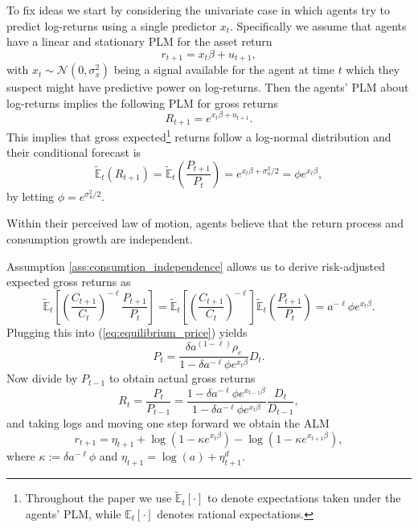 \documentclass[11pt]{article}
\begin{document}
To fix ideas we start by considering the univariate case in which agents try to predict log-returns using a single predictor $x_t$.
Specifically we assume that agents have a linear and stationary PLM for the asset return
\begin{equation}\label{eq:plm_univariate}
    r_{t+1} =  x_{t} \beta + u_{t+1},
\end{equation}
with $x_t \sim \mathcal{N}(0, \sigma^2_x)$ being a signal available for the agent at time $t$ which they suspect might have predictive power on log-returns.
Then the agents' PLM about log-returns implies the following PLM for gross returns
\begin{equation}
    R_{t+1} = e ^ {x_{t} \beta + u_{t+1}}.
\end{equation}
This implies that gross expected\footnote{
Throughout the paper we use $\tilde{\mathbb{E}}_t[\cdot]$ to denote expectations taken under the agents' PLM, while $\mathbb{E}_t[\cdot]$ denotes rational expectations.}
 returns follow a log-normal distribution and their conditional forecast is
\begin{equation}
    \tilde{\mathbb{E}}_t(R_{t+1}) = \tilde{\mathbb{E}}_t\left(\frac{P_{t+1}}{P_t}\right) = e^{x_{t} \beta + \sigma^2_u / 2} = \phi e^{x_{t} \beta},   
\end{equation}
by letting $\phi = e^{\sigma^2_u / 2}$.

\begin{assumption}\label{ass:consumtion_independence}
    Within their perceived law of motion, agents believe that the return process and consumption growth are independent.
\end{assumption}
Assumption \ref{ass:consumtion_independence} allows us to derive risk-adjusted expected gross returns as
\begin{equation}
    \tilde{\mathbb{E}}_t \left[\left( \frac{C_{t+1}}{C_t}\right)^{- \ell} \frac{P_{t+1}}{P_t} \right] = \tilde{\mathbb{E}}_t \left[\left( \frac{C_{t+1}}{C_t}\right)^{- \ell} \right] \tilde{\mathbb{E}}_t\left(\frac{P_{t+1}}{P_t}\right) = a ^ {-\ell} \phi e^{x_t \beta}.
\end{equation}
Plugging this into (\ref{eq:equilibrium_price}) yields
\begin{equation}
    P_t = \frac{\delta a^{(1 - \ell)} \rho_e}{1 - \delta a^{- \ell} \phi e^{x_t \beta}} D_t.
\end{equation} 
Now divide by $P_{t-1}$ to obtain actual gross returns
\begin{equation}
    R_{t} = \frac{P_{t}}{P_{t-1}} = \frac{1 - \delta a^{- \ell} \phi e^{x_{t-1} \beta}}{1 - \delta a^{- \ell} \phi e^{x_{t} \beta}} \frac{D_t}{D_{t-1}},
\end{equation}
and taking logs and moving one step forward we obtain the ALM 
\begin{equation}\label{eq:alm_univariate}
    r_{t+1} = \eta_{t+1} + \log(1 - \kappa e^{x_{t} \beta}) - \log(1 - \kappa e^{x_{t+1} \beta}),
\end{equation}
where $\kappa := \delta a^{- \ell} \phi$ and $\eta_{t+1} = \log(a) + \eta^d_{t+1}$.
\end{document}
